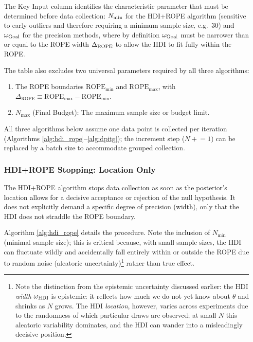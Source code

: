 The Key Input column identifies the characteristic parameter that must be determined
before data collection: $N_{\rm min}$ for the HDI+ROPE algorithm (sensitive to early outliers and
therefore requiring a minimum sample size, e.g.\ 30) and $\omega_{\rm Goal}$ for the
precision methods, where by definition $\omega_{\rm Goal}$ must be narrower than or
equal to the ROPE width $\Delta_{\rm ROPE}$ to allow the HDI to fit fully within the ROPE.

The table also excludes two universal parameters required by all three algorithms:
\begin{enumerate}[label=(\alph*)]
    \item The ROPE boundaries $\mathrm{ROPE}_\mathrm{min}$ and $\mathrm{ROPE}_\mathrm{max}$,
    with $\Delta_\mathrm{ROPE} \equiv \mathrm{ROPE}_\mathrm{max} - \mathrm{ROPE}_\mathrm{min}$.
    \item $N_\mathrm{max}$ (Final Budget): The maximum sample size or budget limit.
\end{enumerate}

All three algorithms below assume one data point is collected per iteration
(Algorithms \ref{alg:hdi_rope}--\ref{alg:dpitg});
the increment step ($N \mathrel{+}= 1$) can be replaced by a batch size to
accommodate grouped collection.

\subsubsection{HDI+ROPE Stopping: Location Only}\label{sec:hdi_rope_stopping}

The HDI+ROPE algorithm stops data collection as soon as the posterior's location allows for a decisive acceptance or rejection of the null hypothesis. It does not explicitly demand a specific degree of precision (width), only that the HDI does not straddle the ROPE boundary.

Algorithm \ref{alg:hdi_rope} details the procedure. Note the inclusion of $N_\mathrm{min}$
(minimal sample size); this is critical because, with small sample sizes, the HDI can
fluctuate wildly and accidentally fall entirely within or outside the ROPE due to random noise
(aleatoric uncertainty)\footnote{Note the distinction from the epistemic uncertainty discussed
earlier: the HDI \textit{width} $\omega_{\rm HDI}$ is epistemic: it reflects how much we do not yet know about
$\theta$ and shrinks as $N$ grows. The HDI \textit{location}, however, varies across experiments
due to the randomness of which particular draws are observed; at small $N$ this aleatoric
variability dominates, and the HDI can wander into a misleadingly decisive position.} rather
than true effect.

